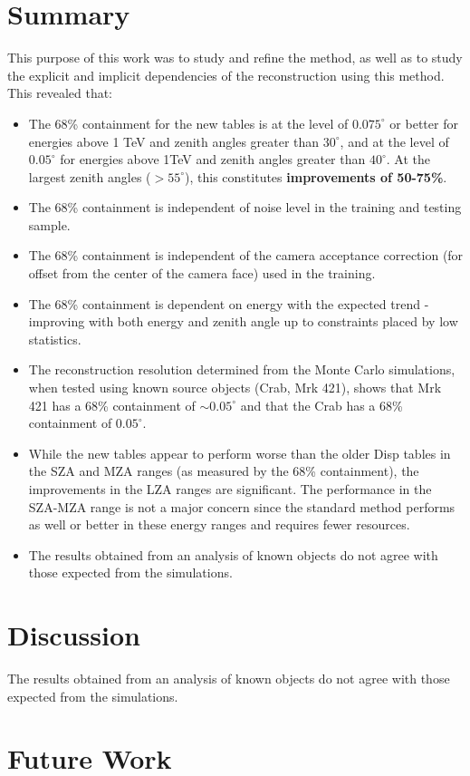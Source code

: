 \documentclass[main.tex]{subfiles}
\begin{document}
\section{Summary}
This purpose of this work was to study and refine the \disp method, as well as to study the explicit and implicit dependencies of the reconstruction using this method. This revealed that:

\begin{itemize}
\item The 68\% containment for the new \disp tables is at the level of $0.075^\circ$ or better for energies above 1 TeV and zenith angles greater than $30^\circ$, and at the level of $0.05^\circ$ for energies above 1TeV and zenith angles greater than $40^\circ$. At the largest zenith angles ($>55^\circ$), this constitutes {\bf improvements of 50-75\%}.
\item The 68\% containment is independent of noise level in the training and testing sample.
\item The 68\% containment is independent of the camera acceptance correction (for offset from the center of the camera face) used in the training.
\item The 68\% containment is dependent on energy with the expected trend - improving with both energy and zenith angle up to constraints placed by low statistics.
\item The reconstruction resolution determined from the Monte Carlo simulations, when tested using known source objects (Crab, Mrk 421), shows that Mrk 421 has a 68\% containment of $\sim 0.05^\circ$ and that the Crab has a 68\% containment of $0.05^\circ$.
\item While the new \disp tables appear to perform worse than the older Disp tables in the SZA and MZA ranges (as measured by the 68\% containment), the improvements in the LZA ranges are significant. The performance in the SZA-MZA range is not a major concern since the standard method performs as well or better in these energy ranges and requires fewer resources.
\item The results obtained from an analysis of known objects do not agree with those expected from the simulations.
\end{itemize}

\section{Discussion}
The results obtained from an analysis of known objects do not agree with those expected from the simulations.

\section{Future Work}
\end{document}
